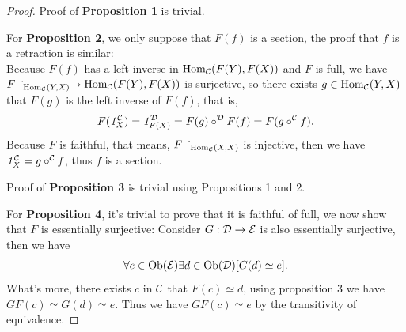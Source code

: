 \documentclass{article}
\begin{document}
\begin{proof}
	Proof of {\bf Proposition 1} is trivial.
	
	For {\bf Proposition 2}, we only suppose that $F(f)$ is a section, the proof that $f$ is a retraction is similar:\\
	Because $F(f)$ has a left inverse in $\mathrm{Hom}_{\mathcal{C}}(F(Y),F(X))$ and $F$ is full, we have $F\upharpoonright_{\mathrm{Hom}_{\mathcal{C}}(Y,X)}\to\mathrm{Hom}_{\mathcal{C}}(F(Y),F(X))$ is surjective, so there exists $g\in\mathrm{Hom}_{\mathcal{C}}(Y,X)$ that $F(g)$ is the left inverse of $F(f)$, that is,
		$$F(\mathit{1}^{\mathcal{C}}_X)=\mathit{1}^{\mathcal{D}}_{F(X)}=F(g)\circ^{\mathcal{D}} F(f)=F(g\circ^{\mathcal{C}} f).$$
	Because $F$ is faithful, that means, $F\upharpoonright_{\mathrm{Hom}_{\mathcal{C}}(X,X)}$ is injective, then we have $\mathit{1}^{\mathcal{C}}_X=g\circ^{\mathcal{C}} f$, thus $f$ is a section.
	
	Proof of {\bf Proposition 3} is trivial using Propositions 1 and 2.
	
	For {\bf Proposition 4}, it's trivial to prove that it is faithful of full, we now show that $F$ is essentially surjective:
	Consider $G:\mathcal{D}\to\mathcal{E}$ is also essentially surjective, then we have
		$$\forall e\in\mathrm{Ob}(\mathcal{E})\exists d\in\mathrm{Ob}(\mathcal{D})[G(d)\simeq e].$$
	What's more, there exists $c$ in $\mathcal{C}$ that $F(c)\simeq d$, using proposition 3 we have $GF(c)\simeq G(d)\simeq e$. Thus we have $GF(c)\simeq e$ by the transitivity of equivalence. 
\end{proof}
\end{document}
